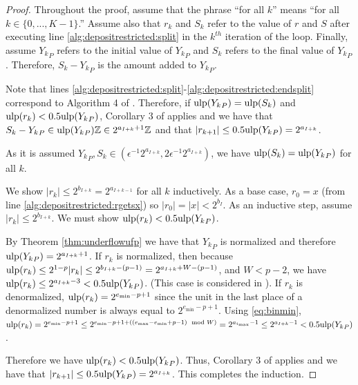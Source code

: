       \begin{proof}
        Throughout the proof, assume that the phrase ``for all $k$'' means
        ``for all $k \in \{0, ..., K - 1\}$.'' Assume also that $r_k$ and $S_k$
        refer to the value of $r$ and $S$ after executing line
        \ref{alg:depositrestricted:split} in the $k^{th}$ iteration of the
        loop. Finally, assume ${Y_k}_P$ refers to the initial value of
        ${Y_k}_P$ and $S_k$ refers to the final value of ${Y_k}_P$. Therefore,
        $S_k - {Y_k}_P$ is the amount added to ${Y_k}_P$.

        Note that lines
        \ref{alg:depositrestricted:split}-\ref{alg:depositrestricted:endsplit}
        correspond to Algorithm 4 of \cite{repsum}.  Therefore, if
        $\text{ulp}({Y_k}_P) = \text{ulp}(S_k)$ and $\text{ulp}(r_k) < 0.5\text{ulp}({Y_k}_P)$,
        Corollary 3 of \cite{repsum} applies and we have that
        $S_k - {Y_k}_P \in \text{ulp}({Y_k}_P)\mathbb{Z} \in 2^{a_{I + k} + 1}\mathbb{Z}$
        and that $|r_{k + 1}| \leq 0.5\text{ulp}({Y_k}_P) = 2^{a_{I + k}}$.

        As it is assumed
        ${Y_k}_P, S_k \in (\epsilon^{-1}  2^{a_{I + k}}, 2  \epsilon^{-1}  2^{a_{I + k}})$,
        we have $\text{ulp}(S_k) = \text{ulp}({Y_k}_P)$ for all $k$.

        We show $|r_k| \leq 2^{b_{I + k}} = 2^{a_{I + k - 1}}$ for all $k$ inductively.
        As a base case, $r_0 = x$ (from line \ref{alg:depositrestricted:rgetsx}) so $|r_0| = |x| < 2^{b_{I}}$.
        As an inductive step, assume $|r_k| \leq 2^{b_{I + k}}$. We must show $\text{ulp}(r_k) < 0.5\text{ulp}({Y_k}_P)$.

        By Theorem \ref{thm:underflowufp} we have that ${Y_k}_P$ is normalized and therefore $\text{ulp}({Y_k}_P) = 2^{a_{I + k} + 1}$.
        If $r_k$ is normalized, then because $\text{ulp}(r_k) \leq 2^{1 - p}|r_k| \leq 2^{b_{I + k} - (p - 1)} = 2^{a_{I + k} + W - (p - 1)}$, and $W < p - 2$, we have $\text{ulp}(r_k) \leq 2^{a_{I + k} - 3} < 0.5\text{ulp}({Y_k}_P)$. (This case is considered in \cite{repsum}).
      If $r_k$ is denormalized, $\text{ulp}(r_k) = 2^{e_{\text{min}} - p + 1}$ since the unit in the last place of a denormalized number is always equal to $2^{e_{\min} - p + 1}$. Using \eqref{eq:binmin}, $\text{ulp}(r_k) = 2^{e_{\text{min}} - p + 1} \leq 2^{e_{\text{min}} - p + 1 + ((e_{\text{max}} - e_{\text{min}} + p - 1) \mod W)} = 2^{a_{i_{\text{max}}} - 1} \leq 2^{a_{I + k} - 1} < 0.5\text{ulp}({Y_k}_P)$.

        Therefore we have $\text{ulp}(r_k) < 0.5\text{ulp}({Y_k}_P)$. Thus, Corollary 3 of \cite{repsum} applies and we have that $|r_{k + 1}| \leq 0.5\text{ulp}({Y_k}_P) = 2^{a_{I + k}}$. This completes the induction.


\end{proof}
